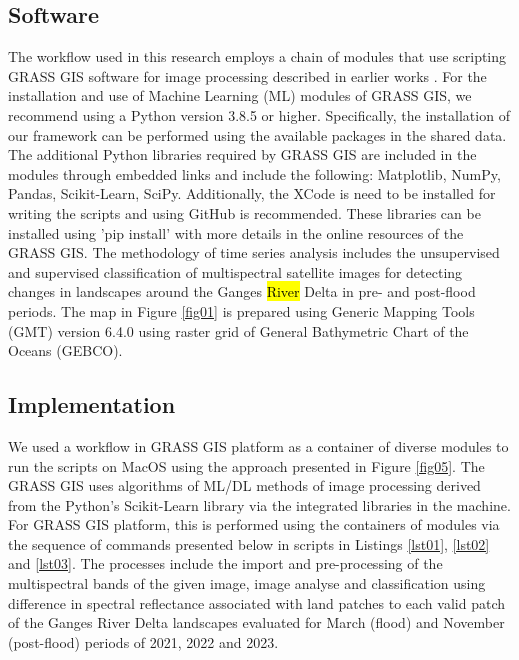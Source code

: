 \documentclass[water,article,submit,pdftex,moreauthors]{Definitions/mdpi}
\begin{document}
\subsection{Software}
The workflow used in this research employs a chain of modules that use scripting GRASS GIS software \cite{GRASS_GIS_software} for image processing described in earlier works \cite{Lemenkova202323,technologies11020046}. For the installation and use of Machine Learning (ML) modules of GRASS GIS, we recommend using a Python version 3.8.5 or higher. Specifically, the installation of our framework can be performed using the available packages in the shared data. The additional Python libraries required by GRASS GIS are included in the modules through embedded links and include the following: Matplotlib, NumPy, Pandas, Scikit-Learn, SciPy. Additionally, the XCode is need to be installed for writing the scripts and using GitHub is recommended. These libraries can be installed using 'pip install' with more details in the online resources of the GRASS GIS. The methodology of time series analysis includes the unsupervised and supervised classification of multispectral satellite images for detecting changes in landscapes around the Ganges \hl{River} Delta in pre- and post-flood periods. The map in Figure \ref{fig01} is prepared using Generic Mapping Tools (GMT) version 6.4.0 \cite{Wessel,WesselSmith} using raster grid of General Bathymetric Chart of the Oceans (GEBCO). 

\subsection{Implementation}
We used a workflow in GRASS GIS platform as a container of diverse modules to run the scripts on MacOS using the approach presented in Figure \ref{fig05}. The GRASS GIS uses algorithms of ML/DL methods of image processing derived from the Python's Scikit-Learn library \cite{pedregosa2011scikit} via the integrated libraries in the machine. For GRASS GIS platform, this is performed using the containers of modules via the sequence of commands presented below in scripts in Listings \ref{lst01}, \ref{lst02} and \ref{lst03}. The processes include the import and pre-processing of the multispectral bands of the given image, image analyse and classification using difference in spectral reflectance associated with land patches to each valid patch of the Ganges River Delta landscapes evaluated for March (flood) and November (post-flood) periods of 2021, 2022 and 2023.
\end{document}
